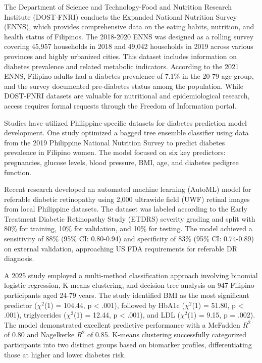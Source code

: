 The Department of Science and Technology-Food and Nutrition Research Institute (DOST-FNRI) conducts the Expanded National Nutrition Survey (ENNS), which provides comprehensive data on the eating habits, nutrition, and health status of Filipinos. The 2018-2020 ENNS was designed as a rolling survey covering 45,957 households in 2018 and 49,042 households in 2019 across various provinces and highly urbanized cities. This dataset includes information on diabetes prevalence and related metabolic indicators. According to the 2021 ENNS, Filipino adults had a diabetes prevalence of 7.1\% in the 20-79 age group, and the survey documented pre-diabetes status among the population. While DOST-FNRI datasets are valuable for nutritional and epidemiological research, access requires formal requests through the Freedom of Information portal.

Studies have utilized Philippine-specific datasets for diabetes prediction model development. One study optimized a bagged tree ensemble classifier using data from the 2019 Philippine National Nutrition Survey to predict diabetes prevalence in Filipino women. The model focused on six key predictors: pregnancies, glucose levels, blood pressure, BMI, age, and diabetes pedigree function.

Recent research developed an automated machine learning (AutoML) model for referable diabetic retinopathy using 2,000 ultrawide field (UWF) retinal images from local Philippine datasets. The dataset was labeled according to the Early Treatment Diabetic Retinopathy Study (ETDRS) severity grading and split with 80\% for training, 10\% for validation, and 10\% for testing. The model achieved a sensitivity of 88\% (95\% CI: 0.80-0.94) and specificity of 83\% (95\% CI: 0.74-0.89) on external validation, approaching US FDA requirements for referable DR diagnosis.

A 2025 study employed a multi-method classification approach involving binomial logistic regression, K-means clustering, and decision tree analysis on 947 Filipino participants aged 24-79 years. The study identified BMI as the most significant predictor ($\chi^2$(1) = 104.44, p < .001), followed by HbA1c ($\chi^2$(1) = 51.80, p < .001), triglycerides ($\chi^2$(1) = 12.44, p < .001), and LDL ($\chi^2$(1) = 9.15, p = .002). The model demonstrated excellent predictive performance with a McFadden $R^2$ of 0.80 and Nagelkerke $R^2$ of 0.85. K-means clustering successfully categorized participants into two distinct groups based on biomarker profiles, differentiating those at higher and lower diabetes risk.

